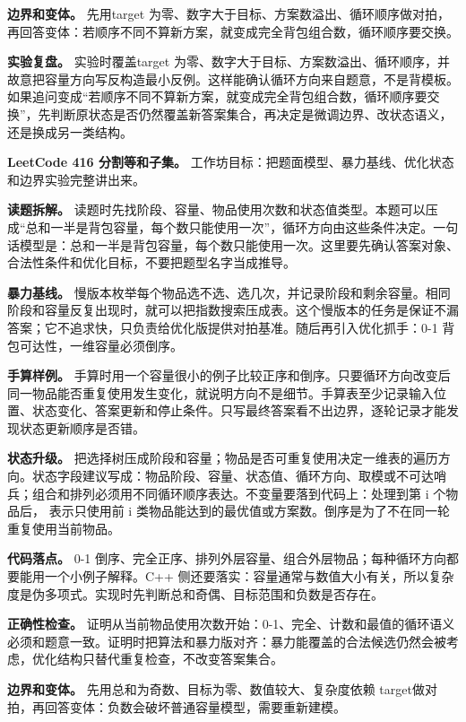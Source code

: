 \textbf{边界和变体。} 先用target 为零、数字大于目标、方案数溢出、循环顺序做对拍，再回答变体：若顺序不同不算新方案，就变成完全背包组合数，循环顺序要交换。

\textbf{实验复盘。} 实验时覆盖target 为零、数字大于目标、方案数溢出、循环顺序，并故意把容量方向写反构造最小反例。这样能确认循环方向来自题意，不是背模板。如果追问变成“若顺序不同不算新方案，就变成完全背包组合数，循环顺序要交换”，先判断原状态是否仍然覆盖新答案集合，再决定是微调边界、改状态语义，还是换成另一类结构。

\noindent\textbf{LeetCode 416 分割等和子集。} 工作坊目标：把题面模型、暴力基线、优化状态和边界实验完整讲出来。

\textbf{读题拆解。} 读题时先找阶段、容量、物品使用次数和状态值类型。本题可以压成“总和一半是背包容量，每个数只能使用一次”，循环方向由这些条件决定。一句话模型是：总和一半是背包容量，每个数只能使用一次。这里要先确认答案对象、合法性条件和优化目标，不要把题型名字当成推导。

\textbf{暴力基线。} 慢版本枚举每个物品选不选、选几次，并记录阶段和剩余容量。相同阶段和容量反复出现时，就可以把指数搜索压成表。这个慢版本的任务是保证不漏答案；它不追求快，只负责给优化版提供对拍基准。随后再引入优化抓手：0-1 背包可达性，一维容量必须倒序。

\textbf{手算样例。} 手算时用一个容量很小的例子比较正序和倒序。只要循环方向改变后同一物品能否重复使用发生变化，就说明方向不是细节。手算表至少记录输入位置、状态变化、答案更新和停止条件。只写最终答案看不出边界，逐轮记录才能发现状态更新顺序是否错。

\textbf{状态升级。} 把选择树压成阶段和容量；物品是否可重复使用决定一维表的遍历方向。状态字段建议写成：物品阶段、容量、状态值、循环方向、取模或不可达哨兵；组合和排列必须用不同循环顺序表达。不变量要落到代码上：处理到第 i 个物品后， 表示只使用前 i 类物品能达到的最优值或方案数。倒序是为了不在同一轮重复使用当前物品。

\textbf{代码落点。} 0-1 倒序、完全正序、排列外层容量、组合外层物品；每种循环方向都要能用一个小例子解释。C++ 侧还要落实：容量通常与数值大小有关，所以复杂度是伪多项式。实现时先判断总和奇偶、目标范围和负数是否存在。

\textbf{正确性检查。} 证明从当前物品使用次数开始：0-1、完全、计数和最值的循环语义必须和题意一致。证明时把算法和暴力版对齐：暴力能覆盖的合法候选仍然会被考虑，优化结构只替代重复检查，不改变答案集合。

\textbf{边界和变体。} 先用总和为奇数、目标为零、数值较大、复杂度依赖 target做对拍，再回答变体：负数会破坏普通容量模型，需要重新建模。

